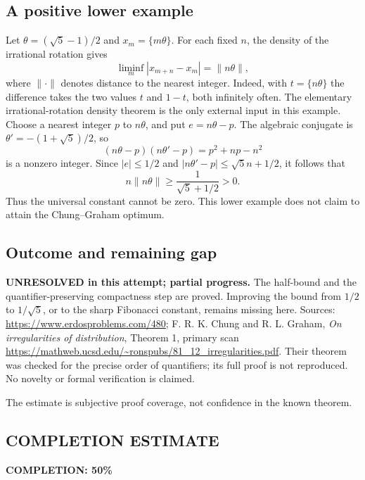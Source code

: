 \subsection*{A positive lower example}
Let $\theta=(\sqrt5-1)/2$ and $x_m=\{m\theta\}$. For each fixed $n$, the density of the irrational rotation gives
\[\liminf_m|x_{m+n}-x_m|=\|n\theta\|,\]
where $\|\cdot\|$ denotes distance to the nearest integer. Indeed, with $t=\{n\theta\}$ the difference takes the two values $t$ and $1-t$, both infinitely often. The elementary irrational-rotation density theorem is the only external input in this example.
Choose a nearest integer $p$ to $n\theta$, and put $e=n\theta-p$. The algebraic conjugate is $\theta'=-(1+\sqrt5)/2$, so
\[(n\theta-p)(n\theta'-p)=p^2+np-n^2\]
is a nonzero integer. Since $|e|\le1/2$ and $|n\theta'-p|\le\sqrt5 n+1/2$, it follows that
\[n\|n\theta\|\ge\frac1{\sqrt5+1/2}>0.\]
Thus the universal constant cannot be zero. This lower example does not claim to attain the Chung--Graham optimum.

\subsection*{Outcome and remaining gap}
\textbf{UNRESOLVED in this attempt; partial progress.} The half-bound and the quantifier-preserving compactness step are proved. Improving the bound from $1/2$ to $1/\sqrt5$, or to the sharp Fibonacci constant, remains missing here.
Sources: \url{https://www.erdosproblems.com/480}; F. R. K. Chung and R. L. Graham, \emph{On irregularities of distribution}, Theorem 1, primary scan \url{https://mathweb.ucsd.edu/~ronspubs/81_12_irregularities.pdf}. Their theorem was checked for the precise order of quantifiers; its full proof is not reproduced. No novelty or formal verification is claimed.

The estimate is subjective proof coverage, not confidence in the known theorem.
\subsection*{COMPLETION ESTIMATE}
\textbf{COMPLETION: 50\%}
